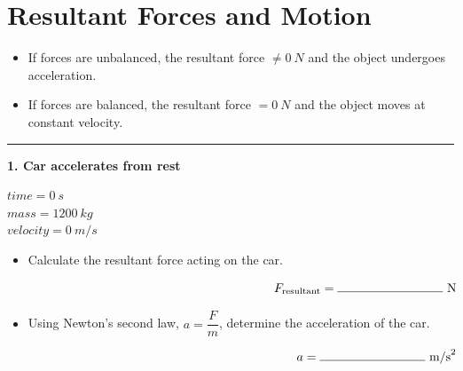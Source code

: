 \documentclass[12pt]{article}
\begin{document}
\section*{Resultant Forces and Motion}

\begin{itemize}
    \item If forces are unbalanced, the resultant force $\neq \SI{0}{N}$ and the object undergoes acceleration.
    \item If forces are balanced, the resultant force $= \SI{0}{N}$ and the object moves at constant velocity.
\end{itemize}

\hrule
\vspace{0.8cm}

\noindent
\begin{minipage}[t]{0.48\textwidth}

\textbf{1. Car accelerates from rest}

\vspace{0.5cm}
$time = \SI{0}{s}$ \\
$mass = \SI{1200}{kg}$ \\
$velocity = \SI{0}{m/s}$ \\

\vspace{0.5cm}

\begin{center}
\end{center}

\end{minipage}
\hfill
\begin{minipage}[t]{0.48\textwidth}

\begin{itemize}[label={}, leftmargin=*]
    \item Calculate the resultant force acting on the car.

    \vspace{2.0cm}
    \[
    \makebox[\linewidth][r]{$F_{\text{resultant}} = \rule{3cm}{0.4pt}\ \text{N}$}
    \]

    \item Using Newton’s second law, $a = \dfrac{F}{m}$, determine the acceleration of the car.

    \vspace{2.0cm}
    \[
    \makebox[\linewidth][r]{$a = \rule{3cm}{0.4pt}\ \text{m/s}^{2}$}
    \]
\end{itemize}

\end{minipage}
\end{document}
